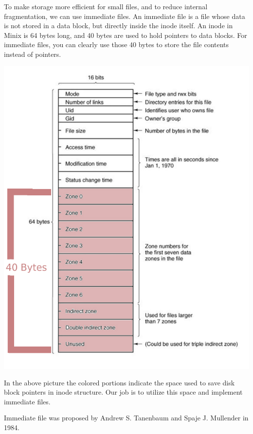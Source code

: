 To make storage more efficient for small files, and to reduce internal fragmentation, we can use immediate files. An immediate file is a file whose data is not stored in a data block, but directly inside the inode itself. An inode in Minix is 64 bytes long, and 40 bytes are used to hold pointers to data blocks. For immediate files, you can clearly use those 40 bytes to store the file contents instead of pointers. 
\begin{center}
\includegraphics[scale=.5]{pics/inode.jpg} 
\end{center}
In the above picture the colored portions indicate the space used to save disk block pointers in inode structure. Our job is to utilize this space and implement immediate files.

Immediate file was proposed by Andrew S. Tanenbaum and Spaje J. Mullender in 1984\cite{astimme}.


